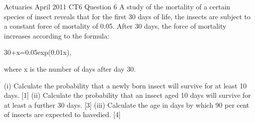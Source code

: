 Actuaries April 2011 CT6 Question 6
A study of the mortality of a certain species of insect reveals that for the first 30 days of life, the insects are subject to a constant force of mortality of 0.05. After 30 days,
the force of mortality increases according to the formula:

30+x=0.05exp(0.01x), 

where x is the number of days after day 30.

(i) Calculate the probability that a newly born insect will survive for at least 10 days. [1]
(ii) Calculate the probability that an insect aged 10 days will survive for at least a further 30 days. [3]
(iii) Calculate the age in days by which 90 per cent of insects are expected to havedied. [4]



